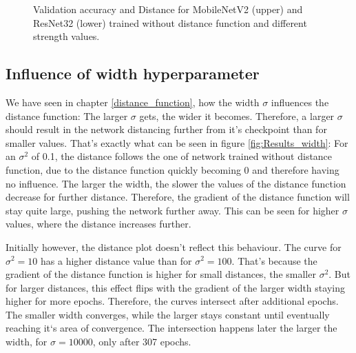\begin{figure}[h]
\begin{center}
        \caption{Validation accuracy and Distance for MobileNetV2 (upper) and ResNet32 (lower) trained without distance function and different strength values.}
    \end{center}
\end{figure}

\subsection{Influence of width hyperparameter}
We have seen in chapter \ref{distance_function}, how the width $\sigma$
influences the distance function: The larger $\sigma$ gets, the wider it
becomes. Therefore, a larger $\sigma$ should result in the network distancing
further from it's checkpoint than for smaller values. That's exactly what can be
seen in figure \ref{fig:Results_width}: For an $\sigma^2$ of 0.1, the distance
follows the one of network trained without distance function, due to the
distance function quickly becoming 0 and therefore having no influence. The
larger the width, the slower the values of the distance function decrease for further
distance. Therefore, the gradient of the distance function will stay quite
large, pushing the network further away. This can be seen for higher $\sigma$
values, where the distance increases further.


Initially however, the distance plot doesn't reflect this behaviour. The curve
for $\sigma^2 = 10$ has a higher distance value than for $\sigma^2 = 100$.
That's because the gradient of the distance function is higher for small distances, the
smaller $\sigma^2$. But for larger distances, this effect flips with the gradient
of the larger width staying higher for more epochs. Therefore, the curves
intersect after additional epochs. The smaller width converges, while the larger
stays constant until eventually reaching it`s area of convergence. The
intersection happens later the larger the width, for $\sigma = 10000$, only
after 307 epochs.

